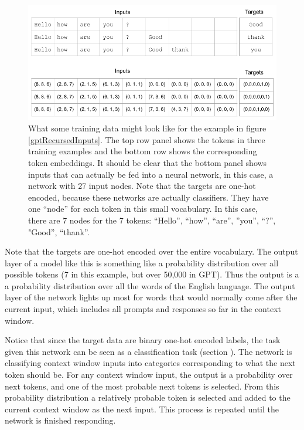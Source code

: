 \begin{figure}[h]
\centering
\includegraphics[scale=.45]{./images/contextWindow.png}
\caption[Jeff Yoshimi]{What some training data might look like for the example in figure \ref{gptRecursedInputs}. The top row panel shows the tokens in three training examples and the bottom row shows the corresponding token embeddings.  It should be clear that the bottom panel shows inputs that can actually be fed into a neural network, in this case, a network with 27 input nodes. Note that the targets are one-hot encoded, because these networks are actually classifiers. They have one ``node'' for each token in this small vocabulary. In this case, there are 7 nodes for the 7 tokens: ``Hello'', ``how'', ``are'', ''you'', ``?'', "Good'', ``thank''.  }
\label{contextWindow}
\end{figure}

Note that the targets are one-hot encoded over the entire vocabulary. The output layer of a model like this is something like a probability distribution over all possible tokens (7 in this example, but over 50,000 in GPT). Thus the output is a a probability distribution over all the words of the English language. The output layer of the network lights up most for words that would normally come after the current input, which includes all prompts and responses so far in the context window. 

Notice that since the target data are binary one-hot encoded labels, the task given this network can be seen as a classification task (section ). The network is classifying context window inputs into categories corresponding to what the next token should be.  For any context window input, the output is a probability over next tokens, and one of the most probable next tokens is selected. From this probability distribution a relatively probable token is selected and added to the current context window as the next input. This process is repeated until the network is finished responding.

